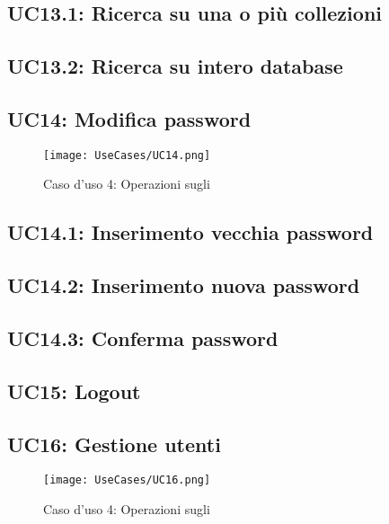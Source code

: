 \documentclass{scalatekids-article}
\begin{document}
\subsection{UC13.1: Ricerca su una o più collezioni}

\subsection{UC13.2: Ricerca su intero database}

\subsection{UC14: Modifica password}

\begin{figure}[H]
  \begin{center}
    \texttt{[image: UseCases/UC14.png]}
    \caption*{Caso d'uso 4: Operazioni sugli }
  \end{center}
\end{figure}

\subsection{UC14.1: Inserimento vecchia password}

\subsection{UC14.2: Inserimento nuova password}

\subsection{UC14.3: Conferma password}

\subsection{UC15: Logout}

\subsection{UC16: Gestione utenti}

\begin{figure}[H]
  \begin{center}
    \texttt{[image: UseCases/UC16.png]}
    \caption*{Caso d'uso 4: Operazioni sugli }
  \end{center}
\end{figure}
\end{document}
